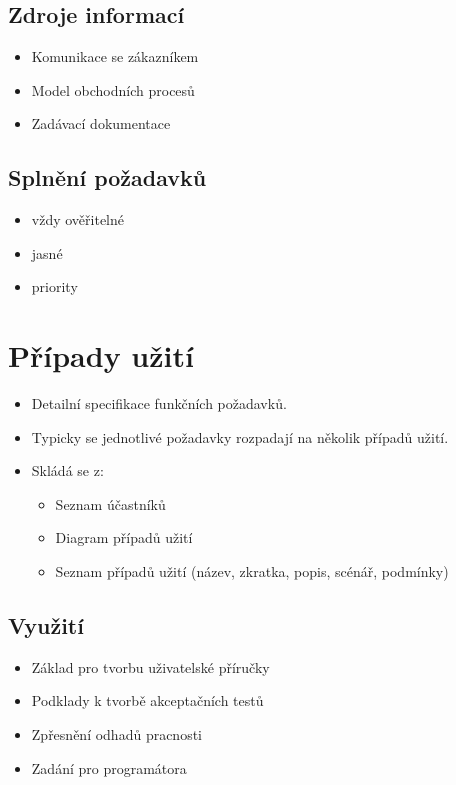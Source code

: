 \documentclass{szzclass}
\begin{document}
\subsection{Zdroje informací}
\begin{itemize}
\item Komunikace se zákazníkem
\item Model obchodních procesů
\item Zadávací dokumentace
\end{itemize}

\subsection{Splnění požadavků}
\begin{itemize}
\item vždy ověřitelné
\item jasné
\item priority
\end{itemize}


\section{Případy užití}
\begin{itemize}
\item Detailní specifikace funkčních požadavků.
\item Typicky se jednotlivé požadavky rozpadají na několik případů užití.
\item Skládá se z:
  \begin{itemize}
    \item Seznam účastníků
    \item Diagram případů užití
    \item Seznam případů užití (název, zkratka, popis, scénář, podmínky)
  \end{itemize}
\end{itemize}

\subsection{Využití}
\begin{itemize}
\item Základ pro tvorbu uživatelské příručky
\item Podklady k tvorbě akceptačních testů
\item Zpřesnění odhadů pracnosti
\item Zadání pro programátora
\end{itemize}
\end{document}
